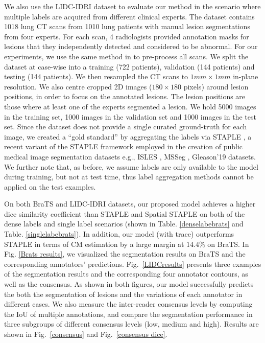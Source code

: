 We also use the LIDC-IDRI dataset to evaluate our method in the scenario where multiple labels are acquired from different clinical experts. The dataset contains 1018 lung CT scans from 1010 lung patients with manual lesion segmentations from four experts. %
For each scan, 4 radiologists provided annotation masks for lesions that they independently detected and considered to be abnormal. For our experiments, we use the same method in \cite{kohl2018probabilistic} to pre-process all scans. We split the dataset at case-wise into a training (722 patients), validation (144 patients) and testing (144 patients). We then resampled the CT scans to $1 mm \times 1 mm$ in-plane resolution. We also centre cropped 2D images ($180 \times 180$ pixels) around lesion positions, in order to focus on the annotated lesions. The lesion positions are those where at least one of the experts segmented a lesion. We hold 5000 images in the training set, 1000 images in the validation set and 1000 images in the test set. Since the dataset does not provide a single curated ground-truth for each image, we created a ``gold standard'' by aggregating the labels via STAPLE \cite{asman2012formulating}, a recent variant of the STAPLE framework employed in the creation of public medical image segmentation datasets e.g., ISLES \cite{winzeck2018isles}, MSSeg \cite{commowick2018objective}, Gleason'19 \cite{gleason2019} datasets. We further note that, as before, we assume labels are only available to the model during training, but not at test time, thus label aggregation methods cannot be applied on the test examples. 

On both BraTS and LIDC-IDRI datasets, our proposed model achieves a higher dice similarity coefficient than STAPLE and Spatial STAPLE on both of the dense labels and single label scenarios (shown in Table. \ref{denselabebrats} and Table. \ref{singlelabebrats}). In addition, our model (with trace) outperforms STAPLE in terms of CM estimation by a large margin at $14.4\%$ on BraTS. In Fig. \ref{Brats results}, we visualized the segmentation results on BraTS and the corresponding annotators' predictions. Fig.~\ref{LIDCresults} presents three examples of the segmentation results and the corresponding four annotator contours, as well as the consensus. As shown in both figures, our model successfully predicts the both the segmentation of lesions and the variations of each annotator in different cases. We also measure the inter-reader consensus levels by computing the IoU of multiple annotations, and compare the segmentation performance in three subgroups of different consensus levels (low, medium and high). Results are shown in Fig.~\ref{consensus} and Fig.~\ref{consensus dice}.

